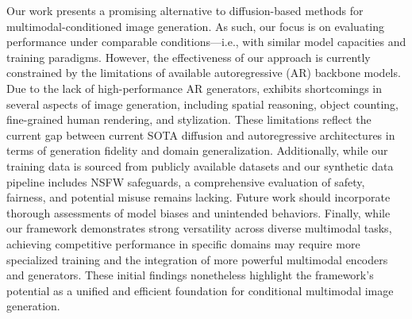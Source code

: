 Our work presents a promising alternative to diffusion-based methods for multimodal-conditioned image generation. As such, our focus is on evaluating performance under comparable conditions—i.e., with similar model capacities and training paradigms.
However, the effectiveness of our approach is currently constrained by the limitations of available autoregressive (AR) backbone models. Due to the lack of high-performance AR generators, \model exhibits shortcomings in several aspects of image generation, including spatial reasoning, object counting, fine-grained human rendering, and stylization. These limitations reflect the current gap between current SOTA diffusion and autoregressive architectures in terms of generation fidelity and domain generalization.
Additionally, while our training data is sourced from publicly available datasets and our synthetic data pipeline includes NSFW safeguards, a comprehensive evaluation of safety, fairness, and potential misuse remains lacking. Future work should incorporate thorough assessments of model biases and unintended behaviors.
Finally, while our framework demonstrates strong versatility across diverse multimodal tasks, achieving competitive performance in specific domains may require more specialized training and the integration of more powerful multimodal encoders and generators. These initial findings nonetheless highlight the framework's potential as a unified and efficient foundation for conditional multimodal image generation.
